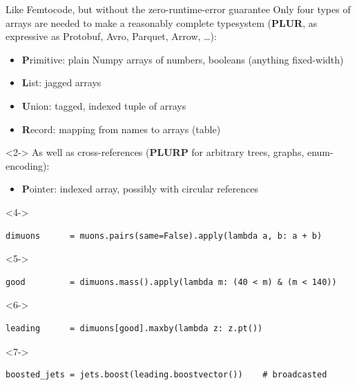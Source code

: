 \documentclass[aspectratio=169]{beamer}
\begin{document}
\begin{frame}[fragile]{Like Femtocode, but without the zero-runtime-error guarantee}
\vspace{0.25 cm}
Only four types of arrays are needed to make a reasonably complete typesystem ({\bf PLUR}, as expressive as Protobuf, Avro, Parquet, Arrow, \ldots):
\begin{itemize}
\item {\bf P}rimitive: plain Numpy arrays of numbers, booleans (anything fixed-width)
\item {\bf L}ist: jagged arrays
\item {\bf U}nion: tagged, indexed tuple of arrays
\item {\bf R}ecord: mapping from names to arrays (table)
\end{itemize}

\vspace{0.25 cm}
\begin{uncoverenv}<2->
As well as cross-references ({\bf PLURP} for arbitrary trees, graphs, enum-encoding):
\begin{itemize}
\item {\bf P}ointer: indexed array, possibly with circular references
\end{itemize}
\end{uncoverenv}

\vspace{0.25 cm}


\small
\begin{uncoverenv}<4->
\begin{verbatim}
dimuons      = muons.pairs(same=False).apply(lambda a, b: a + b)
\end{verbatim}
\end{uncoverenv}
\vspace{-0.35 cm}
\begin{uncoverenv}<5->
\begin{verbatim}
good         = dimuons.mass().apply(lambda m: (40 < m) & (m < 140))
\end{verbatim}
\end{uncoverenv}
\vspace{-0.35 cm}
\begin{uncoverenv}<6->
\begin{verbatim}
leading      = dimuons[good].maxby(lambda z: z.pt())
\end{verbatim}
\end{uncoverenv}
\vspace{-0.35 cm}
\begin{uncoverenv}<7->
\begin{verbatim}
boosted_jets = jets.boost(leading.boostvector())    # broadcasted
\end{verbatim}
\end{uncoverenv}
\end{frame}
\end{document}
